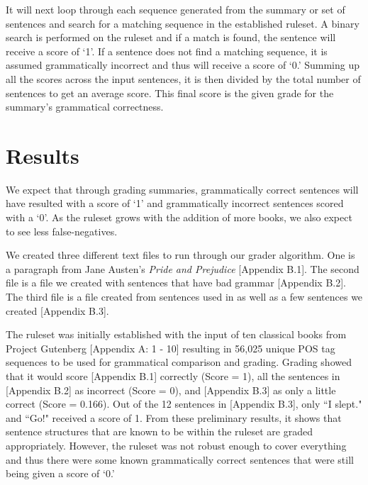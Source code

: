 \documentclass[11pt,a4paper]{article}
\begin{document}
\begin{multicols}{2}
It will next loop through each sequence generated from the summary or set of sentences and search for a matching sequence in the established ruleset. A binary search is performed on the ruleset and if a match is found, the sentence will receive a score of `1'. If a sentence does not find a matching sequence, it is assumed grammatically incorrect and thus will receive a score of `0.' Summing up all the scores across the input sentences, it is then divided by the total number of sentences to get an average score. This final score is the given grade for the summary's grammatical correctness.

  

\section{Results}
We expect that through grading summaries, grammatically correct sentences will have resulted with a score of `1' and grammatically incorrect sentences scored with a `0'. As the ruleset grows with the addition of more books, we also expect to see less false-negatives. 

We created three different text files to run through our grader algorithm. One is a paragraph from Jane Austen's \textit{Pride and Prejudice} [Appendix B.1]. The second file is a file we created with sentences that have bad grammar [Appendix B.2]. The third file is a file created from sentences used in \cite{li2014} as well as a few sentences we created [Appendix B.3].

The ruleset was initially established with the input of ten classical books from Project Gutenberg [Appendix A: 1 - 10] resulting in 56,025 unique POS tag sequences to be used for grammatical comparison and grading. Grading showed that it would score [Appendix B.1] correctly (Score = 1), all the sentences in [Appendix B.2] as incorrect (Score = 0), and [Appendix B.3] as only a little correct (Score = 0.166).  Out of the 12 sentences in [Appendix B.3], only ``I slept." and ``Go!" received a score of 1. From these preliminary results, it shows that sentence structures that are known to be within the ruleset are graded appropriately. However, the ruleset was not robust enough to cover everything and thus there were some known grammatically correct sentences that were still being given a score of `0.'


\end{multicols}
\end{document}
